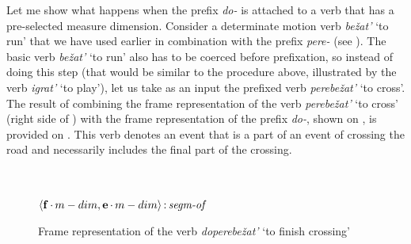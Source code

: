Let me show what happens when the prefix \textit{do-} is attached to a verb that has a pre-selected measure dimension. Consider a determinate motion verb \textit{be\v{z}at'} `to run' that we have used earlier in combination with the prefix \textit{pere-} (see ). The basic verb \textit{be\v{z}at'} `to run' also has to be coerced before prefixation, so instead of doing this step (that would be similar to the procedure above, illustrated by the verb \textit{igrat'} `to play'), let us take as an input the prefixed verb \textit{perebe\v{z}at'} `to cross'. The result of combining the frame representation of the verb \textit{perebe\v{z}at'} `to cross' (right side of ) with the frame representation of the prefix \textit{do-}, shown on , is provided on . This verb denotes an event that is a part of an event of crossing the road and necessarily includes the final part of the crossing. 

\begin{figure}
\begin{center}
\\
 \vspace{1em}
\\
 $\langle{\textbf{\textrm{f}}\,{\cdot}\,m-dim,\textbf{\textrm{e}}\,{\cdot}\,m-dim}\rangle\,{:}\,\textit{segm-of}$\\[1ex]
 \end{center}
\caption{Frame representation of the verb \textit{doperebe\v{z}at'} `to finish crossing' \label{frame:do:perebezhat}}
\end{figure}

